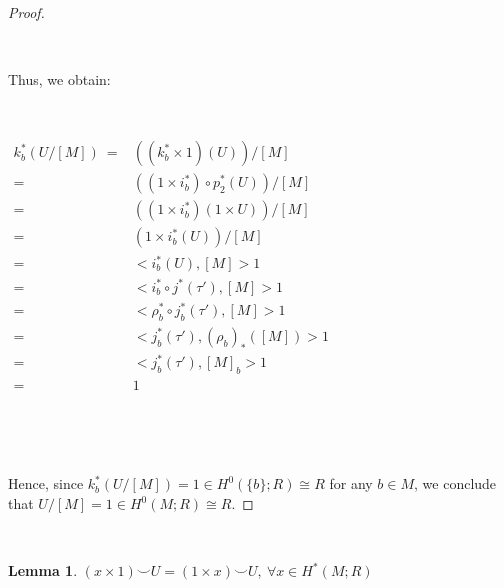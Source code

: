 \documentclass[12pt,oneside]{book}
\newtheorem{lem}    {Lemma}[chapter]
\newcommand{\ccup}{\smile}
\begin{document}
\begin{proof}
        \

        \

        Thus, we obtain:
        
        \

        $\begin{array}{rl}
        	k_{b}^{*}(U/[M]) \ = & \left( (k_{b}^{*}\times 1)(U) \right)/[M] \\
        	= & \left( (1\times i_{b}^{*})\circ p_{2}^{*}(U) \right)/[M] \\
        	= & \left( (1\times i_{b}^{*})(1\times U) \right)/[M] \\
        	= & \left( 1\times i_{b}^{*}(U) \right)/[M] \\
        	= & <i_{b}^{*}(U),[M]>1 \\
        	= & <i_{b}^{*}\circ j^{*}(\tau'),[M]>1 \\
        	= & <\rho_{b}^{*}\circ j_{b}^{*}(\tau'),[M]>1 \\
        	= & <j_{b}^{*}(\tau'),(\rho_{b})_{*}([M])>1 \\
        	= & <j_{b}^{*}(\tau'),[M]_{b}>1 \\
        	= & 1
        \end{array}$

        \

        \

        Hence, since $k_{b}^{*}(U/[M])=1\in H^{0}(\{b\};R)\cong R$ for any $b\in M$, we conclude that $U/[M]=1\in H^{0}(M;R)\cong R$.

    \end{proof}

    \

    \begin{lem}
	$(x\times 1)\ccup U=(1\times x)\ccup U, \ \forall x\in H^{*}(M;R)$
    \end{lem}
\end{document}
